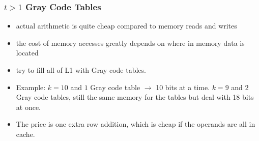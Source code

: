 \documentclass[11pt]{beamer}
\newcommand{\CTD}{\textsf{Core 2 Duo}\xspace}
\begin{document}
\begin{frame}
\frametitle{$t>1$ Gray Code Tables} 
\begin{itemize}
 \item actual arithmetic is quite cheap compared to memory reads and writes
 \item the cost of memory accesses greatly depends on where in memory data is
located
 \item try to fill all of L1 with Gray code tables.
 \item Example: $k=10$ and $1$ Gray code table $\rightarrow$ 10
bits at a time. $k=9$ and $2$ Gray code tables, still the same memory for the
tables but deal with 18 bits at once.
 \item The price is one extra row addition, which is cheap if the
operands are all in cache. 
\end{itemize}
\framebreak

\begin{algorithm}[H]
\label{alg:m4rm_cache_2}
\end{algorithm}

% 
\end{frame}
\end{document}
